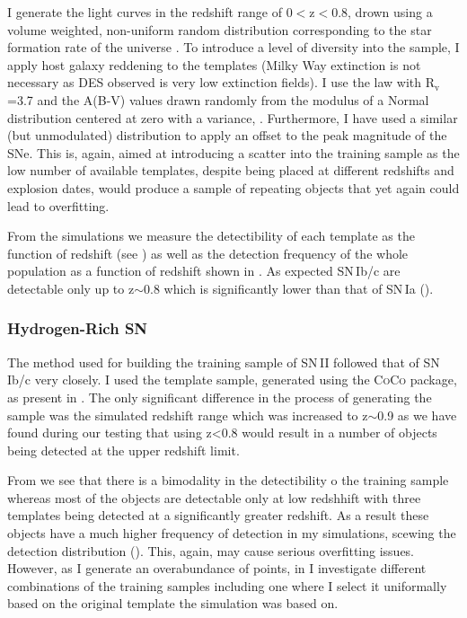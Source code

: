 I generate the light curves in the redshift range of 0$<$z$<$0.8, drown using a volume weighted, non-uniform random distribution corresponding to the star formation rate of the universe \citep{Hopkins2006}. To introduce a level of diversity into the sample, I apply host galaxy reddening to the templates (Milky Way extinction is not necessary as DES observed is very low extinction fields). I use the \citet{Cardelli1989} law with R$_\mathrm{v}$=3.7 and the A(B-V) values drawn randomly from the modulus of a Normal distribution centered at zero with a variance, . Furthermore, I have used a similar (but unmodulated) distribution to apply an offset to the peak magnitude of the SNe. This is, again, aimed at introducing a scatter into the training sample as the low number of available templates, despite being placed at different redshifts and explosion dates, would produce a sample of repeating objects that yet again could lead to overfitting.

From the simulations we measure the detectibility of each template as the function of redshift (see ) as well as the detection frequency of the whole population as a function of redshift shown in . As expected SN\,Ib/c are detectable only up to z$\sim$0.8 which is significantly lower than that of SN\,Ia ().

\begin{figure}
  \caption{}
  \label{fig:IbcDist}
\end{figure}

\subsubsection{Hydrogen-Rich SN}
The method used for building the training sample of SN\,II followed that of SN\,Ib/c very closely. I used the template sample, generated using the \textsc{CoCo} package, as present in . The only significant difference in the process of generating the sample was the simulated redshift range which was increased to z$\sim$0.9 as we have found during our testing that using z<0.8 would result in a number of objects being detected at the upper redshift limit.

\begin{table}
  \caption{}
  \label{tab:SNIITemplates}

\end{table}

From  we see that there is a bimodality in the detectibility o the training sample whereas most of the objects are detectable only at low redshhift with three templates being detected at a significantly greater redshift. As a result these objects have a much higher frequency of detection in my simulations, scewing the detection distribution (). This, again, may cause serious overfitting issues. However, as I generate an overabundance of points, in  I investigate different combinations of the training samples including one where I select it uniformally based on the original template the simulation was based on.

